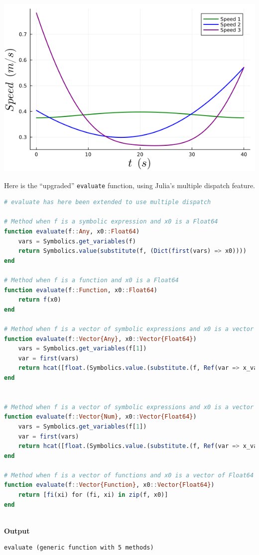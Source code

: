 \begin{center}
    \includegraphics[width=0.45\columnwidth]{graphics/Chap05/MobileRobotSpeeds.png}
\end{center}

\vspace*{.2cm}

\begin{center}
\setlength{\fboxrule}{2pt}  %
\end{center}

\vspace*{.2cm}

Here is the ``upgraded'' \texttt{evaluate} function, using Julia's multiple dispatch feature.

\begin{lstlisting}[language=Julia,style=mystyle]
# evaluate has here been extended to use multiple dispatch

# Method when f is a symbolic expression and x0 is a Float64
function evaluate(f::Any, x0::Float64)
    vars = Symbolics.get_variables(f)
    return Symbolics.value(substitute(f, (Dict(first(vars) => x0))))
end

# Method when f is a function and x0 is a Float64
function evaluate(f::Function, x0::Float64)
    return f(x0)
end

# Method when f is a vector of symbolic expressions and x0 is a vector of Float64                
function evaluate(f::Vector{Any}, x0::Vector{Float64})
    vars = Symbolics.get_variables(f[1])
    var = first(vars)
    return hcat([float.(Symbolics.value.(substitute.(f, Ref(var => x_val)))) for x_val in x0]...)
end                

    
# Method when f is a vector of symbolic expressions and x0 is a vector of Float64                
function evaluate(f::Vector{Num}, x0::Vector{Float64})
    vars = Symbolics.get_variables(f[1])
    var = first(vars)
    return hcat([float.(Symbolics.value.(substitute.(f, Ref(var => x_val)))) for x_val in x0]...)
end 

# Method when f is a vector of functions and x0 is a vector of Float64
function evaluate(f::Vector{Function}, x0::Vector{Float64})
    return [fi(xi) for (fi, xi) in zip(f, x0)]
end
      
\end{lstlisting}
\textbf{Output} 
\begin{verbatim}
evaluate (generic function with 5 methods)
\end{verbatim}

